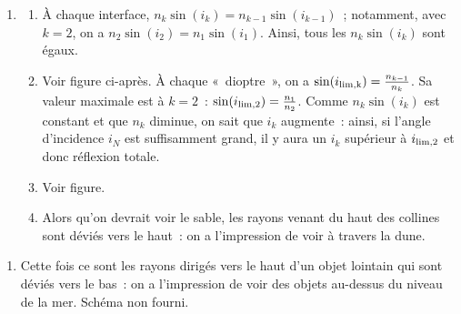 \documentclass[../../main/main.tex]{subfiles}
\begin{document}
{\begin{enumerate}
		\item
		      \begin{enumerate}
			      \item À chaque interface, $n_k\sin(i_k) = n_{k-1}\sin(i_{k-1})$~;
			            notamment, avec $k=2$, on a $n_2\sin(i_2) = n_1\sin(i_1)$. Ainsi,
			            tous les $n_k\sin(i_k)$ sont égaux.
			      \item Voir figure ci-après.\smallbreak
			            À chaque «~dioptre~», on a $\sin(i_{\rm lim, k}) =
				            \frac{n_{k-1}}{n_k}$. Sa valeur maximale est à $k=2$~:
			            $\sin(i_{\rm lim,2}) = \frac{n_1}{n_2}$. Comme $n_k\sin(i_k)$
			            est constant et que $n_k$ diminue, on sait que $i_k$
			            augmente~: ainsi, si l'angle d'incidence $i_N$ est
			            suffisamment grand, il y aura un $i_k$ supérieur à $i_{\rm
						            lim,2}$ et donc réflexion totale.
			      \item Voir figure.
			      \item Alors qu'on devrait voir le sable, les rayons venant du haut des
			            collines sont déviés vers le haut~: on a l'impression de voir à
			            travers la dune.
		      \end{enumerate}
	\end{enumerate}

	\begin{enumerate}[start=2]
		\item Cette fois ce sont les rayons dirigés vers le haut d'un objet lointain
		      qui sont déviés vers le bas~: on a l'impression de voir des objets
		      au-dessus du niveau de la mer. Schéma non fourni.
	\end{enumerate}
}
\end{document}

